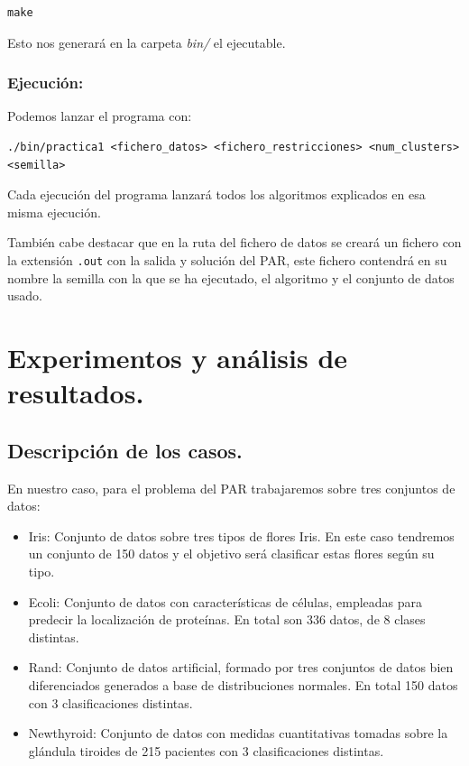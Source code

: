 \documentclass[12pt, spanish]{article}
\begin{document}
\begin{lstlisting}
make
\end{lstlisting}

Esto nos generará en la carpeta \textit{bin/} el ejecutable.


\subsubsection{Ejecución:}

Podemos lanzar el programa con:

\begin{lstlisting}
./bin/practica1 <fichero_datos> <fichero_restricciones> <num_clusters> <semilla>
\end{lstlisting}

Cada ejecución del programa lanzará todos los algoritmos explicados en esa misma ejecución.

También cabe destacar que en la ruta del fichero de datos se creará un fichero con la extensión \texttt{.out} con la salida y solución del PAR, este fichero contendrá en su nombre la semilla con la que se ha ejecutado, el algoritmo y el conjunto de datos usado.


\newpage

\section{Experimentos y análisis de resultados.}


\subsection{Descripción de los casos.}

En nuestro caso, para el problema del PAR trabajaremos sobre tres conjuntos de datos:

\begin{itemize}
	\item{Iris: Conjunto de datos sobre tres tipos de flores Iris. En este caso tendremos un conjunto de 150 datos y el objetivo será clasificar estas flores según su tipo.}
	\item{Ecoli: Conjunto de datos con características de células, empleadas para predecir la localización de proteínas. En total son 336 datos, de 8 clases distintas.}
	\item{Rand: Conjunto de datos artificial, formado por tres conjuntos de datos bien diferenciados generados a base de distribuciones normales. En total 150 datos con 3 clasificaciones distintas.}
	\item{Newthyroid: Conjunto de datos con medidas cuantitativas tomadas sobre la glándula tiroides de 215 pacientes con 3 clasificaciones distintas.} 
\end{itemize}
\end{document}
